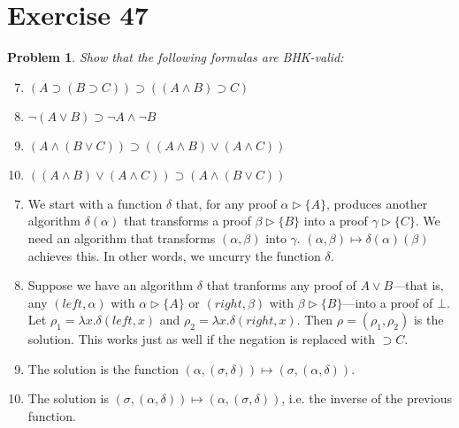 \documentclass[a4paper,10pt]{article}
\newcommand{\imp}{\supset}
\newtheorem*{problem*}{Problem}
\theoremstyle{definition}
\begin{document}
\section*{Exercise 47}

\begin{problem*}
Show that the following formulas are BHK-valid:

\begin{enumerate}
  \setcounter{enumi}{6}
 \item $(A \imp (B \imp C)) \imp ((A ∧ B) \imp C)$
\item $¬(A ∨ B) \imp ¬A ∧ ¬B$
\item $(A ∧(B ∨ C)) \imp ((A ∧ B) ∨ (A ∧ C))$
\item $((A ∧ B) ∨ (A ∧ C)) \imp (A ∧(B ∨ C))$
\end{enumerate}
\end{problem*}
\begin{enumerate}
\setcounter{enumi}{6}
 \item We start with a function $δ$ that, for any proof $α \triangleright \{A\}$, produces another algorithm $δ(α)$ that transforms a proof $β \triangleright \{B\}$ into a proof $γ \triangleright \{C\}$. We need an algorithm that
 transforms $(α,β)$ into $γ$. $(α,β) \mapsto δ(α)(β)$ achieves this. In other words, we uncurry the function $δ$.
 \item Suppose we have an algorithm $δ$ that tranforms any proof of $A ∨ B$---that is, any $(left, α)$ with $α \triangleright \{A\}$ or $(right,β)$ with $β \triangleright \{B\}$---into a proof of $\bot$. Let $ρ_1 = λx.δ (left,x)$ and $ρ_2 =
 λx.δ (right, x)$. Then $ρ = (ρ_1,ρ_2)$ is the solution. This works just as well if the negation is replaced with $\imp C$.
 \item The solution is the function $(α,(σ,δ)) \mapsto (σ, (α, δ))$.
\item The solution is $(σ,(α,δ)) \mapsto (α,(σ,δ))$, i.e. the inverse of the previous function.
 \end{enumerate}
\end{document}
